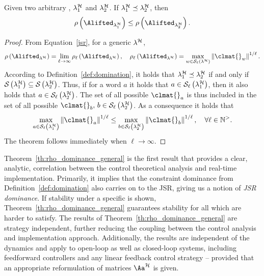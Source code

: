 \begin{theorem}%
    \label{th:rho_dominance_general}%
    Given two arbitrary \ewhc{}, $\lambda_1^{\mathcal{H}}$ and $\lambda_2^{\mathcal{H}}$.
    If $\lambda_1^{\mathcal{H}} \preceq \lambda_2^{\mathcal{H}}$, then
    \begin{equation*}
        \rho\funof{\Alifted_{\lambda_1^\strat}} \leq \rho\funof{\Alifted_{\lambda_2^\strat}}.
    \end{equation*}

    \begin{proof}
        From Equation~\eqref{jsr}, for a generic \ewhc{} $\lambda^{\mathcal{H}}$,
        \begin{equation*}
            \rho\left(\Alifted_{\lambda^\strat}\right) = \lim_{\ell\rightarrow \infty}\rho_\ell\left(\Alifted_{\lambda^\strat}\right), \quad \rho_\ell\left(\Alifted_{\lambda^\strat}\right) = \max_{w \in \sset{\ell}{\lambda^\strat}}\norm{\clmat{}_{w}}^{1/\ell}.
        \end{equation*}
        According to Definition~\ref{def:domination}, it holds that $\lambda^{\mathcal{H}}_1 \preceq \lambda^{\mathcal{H}}_2$ if and only if $\mathcal{S}_{}\left( \lambda^{\mathcal{H}}_1 \right) \subseteq \mathcal{S}_{}\left( \lambda^{\mathcal{H}}_2 \right)$.
        Thus, if for a word $a$ it holds that $a \in \mathcal{S}_{\ell}\left( \lambda^{\mathcal{H}}_1 \right)$, then it also holds that $a \in \mathcal{S}_{\ell}\left( \lambda^{\mathcal{H}}_2 \right)$.
        The set of all possible $\clmat{}_{a}$ is thus included in the set of all possible $\clmat{}_{b},\, b \in \sset{\ell}{\lambda^\strat_2}$.
        As a consequence it holds that
        \begin{equation*}
            \max_{a \in \sset{\ell}{\lambda^\strat_1}}\norm{\clmat{}_{a}}^{1/\ell} \leq
            \max_{b \in \sset{\ell}{\lambda^\strat_2}}\norm{\clmat{}_{b}}^{1/\ell}, \quad
            \forall \ell\in\mathbb{N}^{>}.
        \end{equation*}
        The theorem follows immediately when $\ell\rightarrow \infty$.
    \end{proof}
\end{theorem}

Theorem~\ref{th:rho_dominance_general} is the first result that provides a clear, analytic, correlation between the control theoretical analysis and real-time implementation.
Primarily, it implies that the constraint dominance from Definition~\ref{def:domination} also carries on to the JSR, giving us a notion of \emph{JSR dominance}.
If stability under a specific \ewhc{} is shown, Theorem~\ref{th:rho_dominance_general} guarantees stability for all \ewhc{} which are harder to satisfy.
The results of Theorem~\ref{th:rho_dominance_general} are strategy independent, further reducing the coupling between the control analysis and implementation approach.
Additionally, the results are independent of the dynamics and apply to open-loop as well as closed-loop systems, including feedforward controllers and any linear feedback control strategy -- provided that an appropriate reformulation of matrices $\Aa^\strat$ is given.

